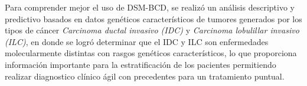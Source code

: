  Para comprender mejor el uso de DSM-BCD, se realizó un análisis descriptivo y predictivo basados en datos genéticos característicos de tumores generados por los tipos de cáncer \textit{Carcinoma ductal invasivo (IDC)} y \textit{Carcinoma lobulillar invasivo (ILC)}, en donde se logró determinar que el IDC y ILC son enfermedades molecularmente distintas con rasgos genéticos característicos, lo que proporciona información importante para la estratificación de los pacientes permitiendo realizar diagnostico clínico ágil con precedentes para un tratamiento puntual.
 
 
 
 
 
 
 
 
 
